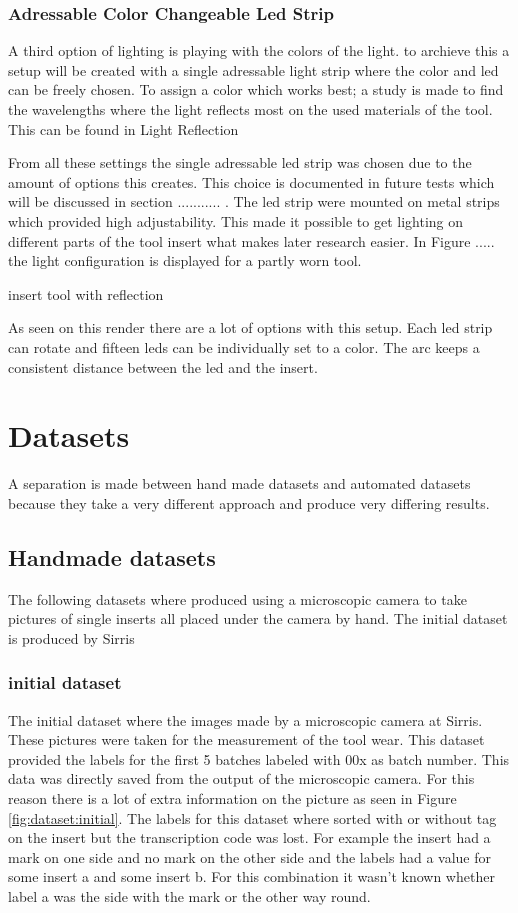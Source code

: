 	\subsubsection{Adressable Color Changeable Led Strip}

		A third option of lighting is playing with the colors of the light. to archieve this a setup will be created with a single adressable light strip where the color and led can be freely chosen. 
		To assign a color which works best; a study is made to find the wavelengths where the light reflects most on the used materials of the tool. This can be found in  Light Reflection

From all these settings the single adressable led strip was chosen due to the amount of options this creates. This choice is documented in future tests which will be discussed in section ........... . The led strip were mounted on metal strips which provided high adjustability. This made it possible to get lighting on different parts of the tool insert what makes later research easier. In Figure ..... the light configuration is displayed for a partly worn tool.
	
	insert tool with reflection
	
	As seen on this render there are a lot of options with this setup. Each led strip can rotate and fifteen leds can be individually set to a color. The arc keeps a consistent distance between the led and the insert. 

\section{Datasets}
A separation is made between hand made datasets and automated datasets because they take a very different approach and produce very differing results.

	\subsection{Handmade datasets}

The following datasets where produced using a microscopic camera to take pictures of single inserts all placed under the camera by hand. The initial dataset is produced by Sirris 

		\subsubsection{initial dataset}

			The initial dataset where the images made by a microscopic camera at Sirris. These pictures were taken for the measurement of the tool wear. This dataset provided the labels for the first 5 batches labeled with 00x as batch number. This data was directly saved from the output of the microscopic camera. For this reason there is a lot of extra information on the picture as seen in Figure \ref{fig:dataset:initial}. The labels for this dataset where sorted with or without tag on the insert but the transcription code was lost. For example the insert had a mark on one side and no mark on the other side and the labels had a value for some insert a and some insert b. For this combination it wasn't known whether label a was the side with the mark or the other way round.
			
